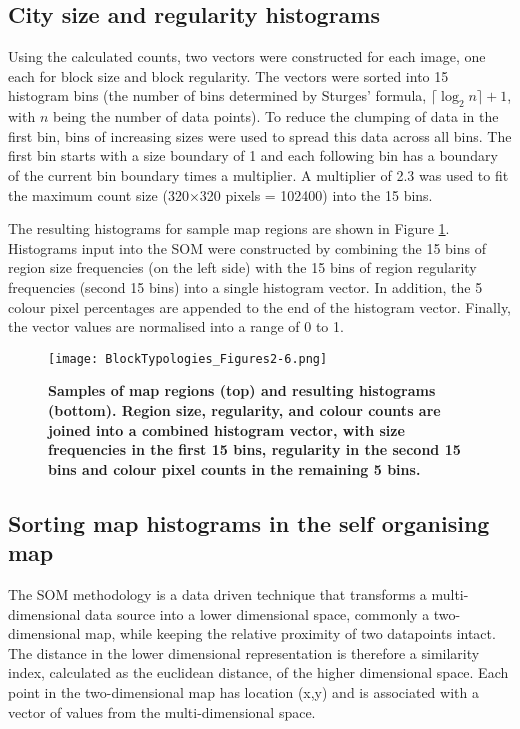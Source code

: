 \documentclass[9pt,twocolumn,twoside,lineno]{pnas-new}
\begin{document}
{\subsection*{City size and regularity histograms}\label{methodshist}

Using the calculated counts, two vectors were constructed for each image, one each for block size and block regularity. The vectors were sorted into 15 histogram bins (the number of bins determined by Sturges' formula\cite{Sturges1926}, $\lceil \log_{2}n \rceil +1$, with $n$ being the number of data points). To reduce the clumping of data in the first bin, bins of increasing sizes were used to spread this data across all bins. The first bin starts with a size boundary of 1 and each following bin has a boundary of the current bin boundary times a multiplier. A multiplier of 2.3 was used to fit the maximum count size (320$\times$320 pixels = 102400) into the 15 bins.

The resulting histograms for sample map regions are shown in Figure \ref{fig:mapsandHist}. Histograms input into the SOM were constructed by combining the 15 bins of region size frequencies (on the left side) with the 15 bins of region regularity frequencies (second 15 bins) into a single histogram vector. In addition, the 5 colour pixel percentages are appended to the end of the histogram vector. Finally, the vector values are normalised into a range of 0 to 1.


\begin{figure}
\centering
 \texttt{[image: BlockTypologies\_Figures2-6.png]}
\caption{\bf Samples of map regions (top) and resulting histograms (bottom). Region size, regularity, and colour counts are joined into a combined histogram vector, with size frequencies in the first 15 bins, regularity in the second 15 bins and colour pixel counts in the remaining 5 bins.}
 \label{fig:mapsandHist}
\end{figure} 

\subsection*{Sorting map histograms in the self organising map}\label{methodscluster}
The SOM methodology\cite{Kohonen1982} is a data driven technique that transforms a multi-dimensional data source into a lower dimensional space, commonly a two-dimensional map, while keeping the relative proximity of two datapoints intact. The distance in the lower dimensional representation is therefore a similarity index, calculated as the euclidean distance, of the higher dimensional space. Each point in the two-dimensional map has location (x,y) and is associated with a vector of values from the multi-dimensional space.

}
\end{document}
